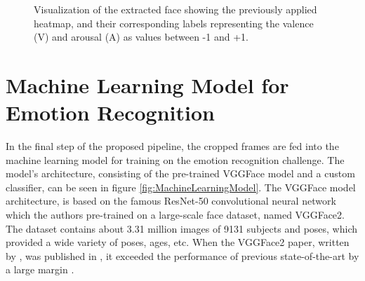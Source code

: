 \begin{figure}[H]
  \hfill
  \hfill
  \caption{Visualization of the extracted face showing the previously applied heatmap, and their corresponding labels representing the valence (V) and arousal (A) as values between -1 and +1.}
  \label{fig:MethodologyExtraction}
\end{figure}


\section{Machine Learning Model for Emotion Recognition}
In the final step of the proposed pipeline, the cropped frames are fed into the machine learning model for training on the emotion recognition challenge. The model's architecture, consisting of the pre-trained VGGFace model \citep{Cao:2018:VGGFace2} and a custom classifier, can be seen in figure \ref{fig:MachineLearningModel}.
\newline\newline
The VGGFace model architecture, is based on the famous ResNet-50 convolutional neural network which the authors \citet{Cao:2018:VGGFace2} pre-trained on a large-scale face dataset, named VGGFace2. The dataset contains about 3.31 million images of 9131 subjects and poses, which provided a wide variety of poses, ages, etc. When the VGGFace2 paper, written by \citet{Cao:2018:VGGFace2}, was published in \citeyear{Cao:2018:VGGFace2}, it exceeded the performance of previous state-of-the-art by a large margin \citep{Cao:2018:VGGFace2}.

